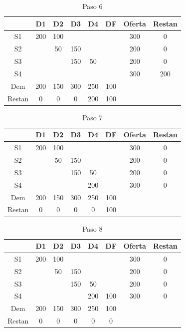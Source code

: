 \documentclass[12pt]{article}  %
\begin{document}
\begin{table}[H]
\centering
\caption{Paso 6}
\label{tab:paso6Prob4}
\begin{tabular}{c|ccccc|cc}
& D1 & D2 & D3 & D4 & DF & Oferta & Restan \\
\hline
S1 & 200 & 100 & & & & 300 & 0 \\
S2 & & 50 & 150 & & & 200 & 0 \\
S3 & & & 150 & \cellcolor{yellow}50 & & 200 & 0 \\
S4 & & & & & & 300 & 200 \\
\hline
Dem & 200 & 150 & 300 & 250 & 100 & & \\
Restan & 0 & 0 & 0 & 200 & 100 & & 
\end{tabular}
\end{table}

\begin{table}[H]
\centering
\caption{Paso 7}
\label{tab:paso7Prob4}
\begin{tabular}{c|ccccc|cc}
& D1 & D2 & D3 & D4 & DF & Oferta & Restan \\
\hline
S1 & 200 & 100 & & & & 300 & 0 \\
S2 & & 50 & 150 & & & 200 & 0 \\
S3 & & & 150 & 50 & & 200 & 0 \\
S4 & & & & \cellcolor{yellow}200 & & 300 & 0 \\
\hline
Dem & 200 & 150 & 300 & 250 & 100 & & \\
Restan & 0 & 0 & 0 & 0 & 100 & & 
\end{tabular}
\end{table}

\begin{table}[H]
\centering
\caption{Paso 8}
\label{tab:paso8Prob4}
\begin{tabular}{c|ccccc|cc}
& D1 & D2 & D3 & D4 & DF & Oferta & Restan \\
\hline
S1 & 200 & 100 & & & & 300 & 0 \\
S2 & & 50 & 150 & & & 200 & 0 \\
S3 & & & 150 & 50 & & 200 & 0 \\
S4 & & & & 200 & \cellcolor{yellow}100 & 300 & 0 \\
\hline
Dem & 200 & 150 & 300 & 250 & 100 & & \\
Restan & 0 & 0 & 0 & 0 & 0 & & 
\end{tabular}
\end{table}
\end{document}
